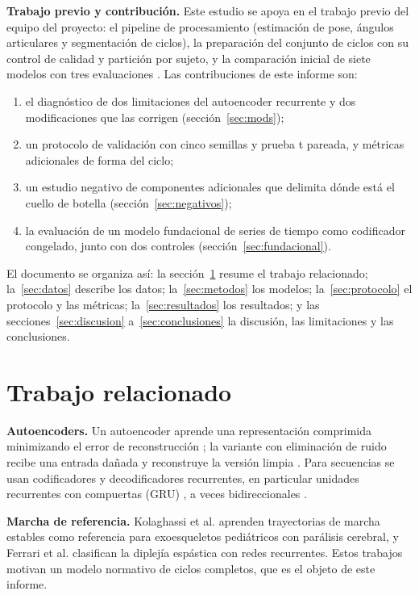 \documentclass[11pt,a4paper]{amsart}
\begin{document}
\textbf{Trabajo previo y contribución.} Este estudio se apoya en el trabajo previo del equipo del proyecto: el pipeline de procesamiento (estimación de pose, ángulos articulares y segmentación de ciclos), la preparación del conjunto de ciclos con su control de calidad y partición por sujeto, y la comparación inicial de siete modelos con tres evaluaciones \cite{neurostride2026}. Las contribuciones de este informe son:
\begin{enumerate}[label=(\roman*)]
\item el diagnóstico de dos limitaciones del autoencoder recurrente y dos modificaciones que las corrigen (sección~\ref{sec:mods});
\item un protocolo de validación con cinco semillas y prueba t pareada, y métricas adicionales de forma del ciclo;
\item un estudio negativo de componentes adicionales que delimita dónde está el cuello de botella (sección~\ref{sec:negativos});
\item la evaluación de un modelo fundacional de series de tiempo como codificador congelado, junto con dos controles (sección~\ref{sec:fundacional}).
\end{enumerate}

El documento se organiza así: la sección~\ref{sec:relacionado} resume el trabajo relacionado; la~\ref{sec:datos} describe los datos; la~\ref{sec:metodos} los modelos; la~\ref{sec:protocolo} el protocolo y las métricas; la~\ref{sec:resultados} los resultados; y las secciones~\ref{sec:discusion} a~\ref{sec:conclusiones} la discusión, las limitaciones y las conclusiones.

\section{Trabajo relacionado}
\label{sec:relacionado}

\textbf{Autoencoders.} Un autoencoder aprende una representación comprimida minimizando el error de reconstrucción \cite{hinton2006}; la variante con eliminación de ruido recibe una entrada dañada y reconstruye la versión limpia \cite{vincent2008}. Para secuencias se usan codificadores y decodificadores recurrentes, en particular unidades recurrentes con compuertas (GRU) \cite{cho2014}, a veces bidireccionales \cite{schuster1997}.

\textbf{Marcha de referencia.} Kolaghassi et al. \cite{kolaghassi2023} aprenden trayectorias de marcha estables como referencia para exoesqueletos pediátricos con parálisis cerebral, y Ferrari et al. \cite{ferrari2019} clasifican la diplejía espástica con redes recurrentes. Estos trabajos motivan un modelo normativo de ciclos completos, que es el objeto de este informe.
\end{document}
